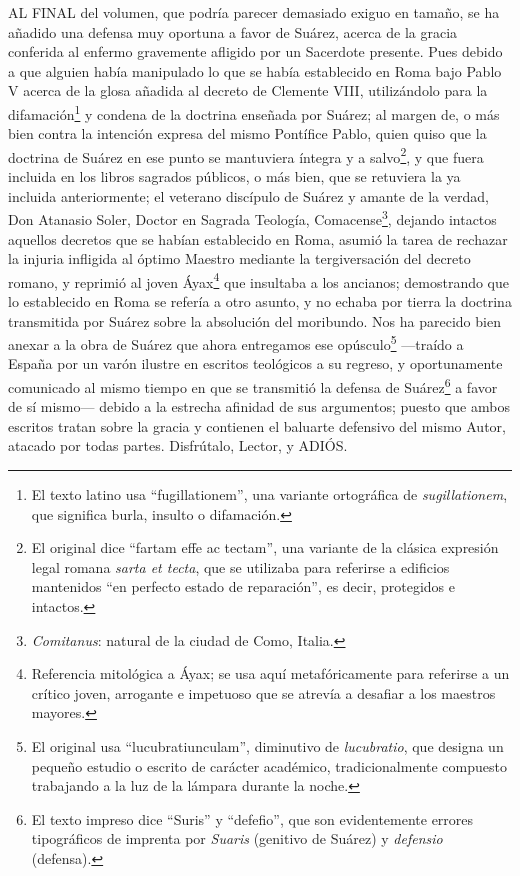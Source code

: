 \documentclass{article}
\begin{document}
AL FINAL del volumen, que podría parecer demasiado exiguo en tamaño, se ha añadido una
defensa muy oportuna a favor de Suárez, acerca de la gracia conferida al enfermo
gravemente afligido por un Sacerdote presente. Pues debido a que alguien había
manipulado lo que se había establecido en Roma bajo Pablo V acerca de la glosa añadida
al decreto de Clemente VIII, utilizándolo para la difamación\footnote{El texto latino
usa \enquote{fugillationem}, una variante ortográfica de \textit{sugillationem}, que
significa burla, insulto o difamación.} y condena de la doctrina enseñada por Suárez; al
margen de, o más bien contra la intención expresa del mismo Pontífice Pablo, quien quiso
que la doctrina de Suárez en ese punto se mantuviera íntegra y a salvo\footnote{El
original dice \enquote{fartam effe ac tectam}, una variante de la clásica expresión
legal romana \textit{sarta et tecta}, que se utilizaba para referirse a edificios
mantenidos \enquote{en perfecto estado de reparación}, es decir, protegidos e
intactos.}, y que fuera incluida en los libros sagrados públicos, o más bien, que se
retuviera la ya incluida anteriormente; el veterano discípulo de Suárez y amante de la
verdad, Don Atanasio Soler, Doctor en Sagrada Teología,
Comacense\footnote{\textit{Comitanus}: natural de la ciudad de Como, Italia.}, dejando
intactos aquellos decretos que se habían establecido en Roma, asumió la tarea de
rechazar la injuria infligida al óptimo Maestro mediante la tergiversación del decreto
romano, y reprimió al joven Áyax\footnote{Referencia mitológica a Áyax; se usa aquí
metafóricamente para referirse a un crítico joven, arrogante e impetuoso que se atrevía
a desafiar a los maestros mayores.} que insultaba a los ancianos; demostrando que lo
establecido en Roma se refería a otro asunto, y no echaba por tierra la doctrina
transmitida por Suárez sobre la absolución del moribundo. Nos ha parecido bien anexar a
la obra de Suárez que ahora entregamos ese opúsculo\footnote{El original usa
\enquote{lucubratiunculam}, diminutivo de \textit{lucubratio}, que designa un pequeño
estudio o escrito de carácter académico, tradicionalmente compuesto trabajando a la luz
de la lámpara durante la noche.} —traído a España por un varón ilustre en escritos
teológicos a su regreso, y oportunamente comunicado al mismo tiempo en que se transmitió
la defensa de Suárez\footnote{El texto impreso dice \enquote{Suris} y \enquote{defefio},
que son evidentemente errores tipográficos de imprenta por \textit{Suaris} (genitivo de
Suárez) y \textit{defensio} (defensa).} a favor de sí mismo— debido a la estrecha
afinidad de sus argumentos; puesto que ambos escritos tratan sobre la gracia y contienen
el baluarte defensivo del mismo Autor, atacado por todas partes. Disfrútalo, Lector, y
ADIÓS.
\end{document}
